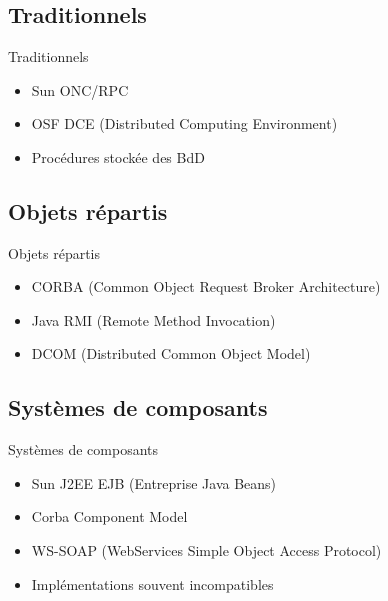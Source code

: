 \section{\sectitle}
\begin{frame}{\sectitle}
    \def\subsectitle{Traditionnels}
    \subsection{\subsectitle}
    \begin{block}{\subsectitle}
        \begin{itemize}
            \item Sun ONC/RPC
            \item OSF DCE (Distributed Computing Environment)
            \item Procédures stockée des BdD
        \end{itemize}
    \end{block}
    \def\subsectitle{Objets répartis}
    \subsection{\subsectitle}
    \begin{block}{\subsectitle}
        \begin{itemize}
            \item CORBA (Common Object Request Broker Architecture)
            \item Java RMI (Remote Method Invocation)
            \item DCOM (Distributed Common Object Model)
        \end{itemize}
    \end{block}
\end{frame}

\begin{frame}{\sectitle}
    \def\subsectitle{Systèmes de composants}
    \subsection{\subsectitle}
    \begin{block}{\subsectitle}
        \begin{itemize}
            \item Sun  J2EE EJB (Entreprise Java Beans)
            \item Corba Component Model
            \item WS-SOAP (WebServices Simple Object Access Protocol)
            \item Implémentations souvent incompatibles
        \end{itemize}
    \end{block}
\end{frame}

